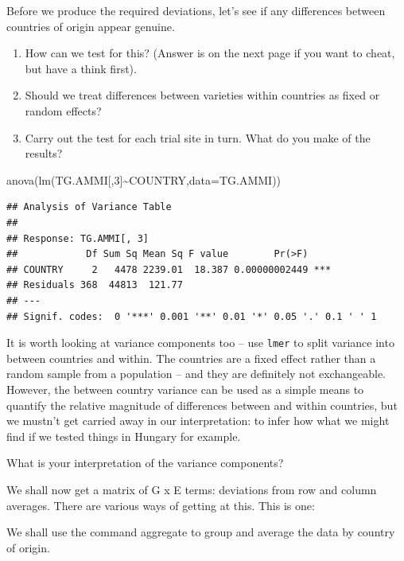 \documentclass[
]{book}
\newenvironment{Shaded}{\begin{snugshade}}{\end{snugshade}}
\newcommand{\AttributeTok}[1]{\textcolor[rgb]{0.77,0.63,0.00}{#1}}
\newcommand{\DecValTok}[1]{\textcolor[rgb]{0.00,0.00,0.81}{#1}}
\newcommand{\FunctionTok}[1]{\textcolor[rgb]{0.00,0.00,0.00}{#1}}
\newcommand{\NormalTok}[1]{#1}
\newcommand{\SpecialCharTok}[1]{\textcolor[rgb]{0.00,0.00,0.00}{#1}}
\begin{document}
Before we produce the required deviations, let's see if any differences between countries of origin appear genuine.

\begin{enumerate}
\def\labelenumi{\arabic{enumi}.}
\item
  How can we test for this? (Answer is on the next page if you want to cheat, but have a think first).
\item
  Should we treat differences between varieties within countries as fixed or random effects?
\item
  Carry out the test for each trial site in turn. What do you make of the results?
\end{enumerate}

\begin{Shaded}
\begin{Highlighting}[]
\FunctionTok{anova}\NormalTok{(}\FunctionTok{lm}\NormalTok{(TG.AMMI[,}\DecValTok{3}\NormalTok{]}\SpecialCharTok{\textasciitilde{}}\NormalTok{COUNTRY,}\AttributeTok{data=}\NormalTok{TG.AMMI))}
\end{Highlighting}
\end{Shaded}

\begin{verbatim}
## Analysis of Variance Table
## 
## Response: TG.AMMI[, 3]
##            Df Sum Sq Mean Sq F value        Pr(>F)    
## COUNTRY     2   4478 2239.01  18.387 0.00000002449 ***
## Residuals 368  44813  121.77                          
## ---
## Signif. codes:  0 '***' 0.001 '**' 0.01 '*' 0.05 '.' 0.1 ' ' 1
\end{verbatim}

It is worth looking at variance components too -- use \texttt{lmer} to split variance into between countries and within. The countries are a fixed effect rather than a random sample from a population -- and they are definitely not exchangeable. However, the between country variance can be used as a simple means to quantify the relative magnitude of differences between and within countries, but we mustn't get carried away in our interpretation: to infer how what we might find if we tested things in Hungary for example.

What is your interpretation of the variance components?

We shall now get a matrix of G x E terms: deviations from row and column averages. There are various ways of getting at this. This is one:

We shall use the command aggregate to group and average the data by country of origin.
\end{document}

